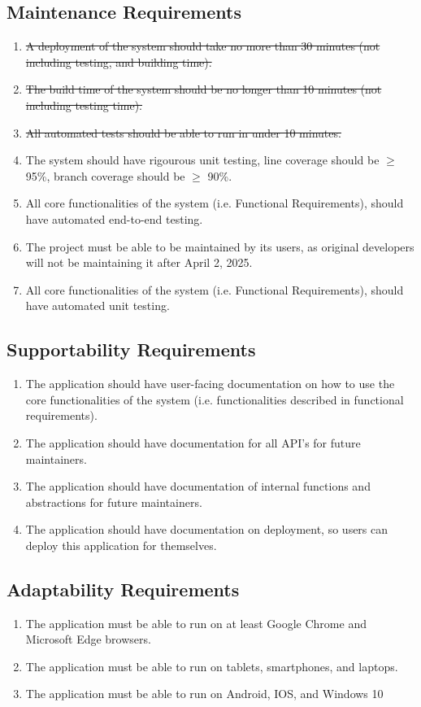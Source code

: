 \documentclass[12pt]{article}
\begin{document}
\subsection{Maintenance Requirements}
\begin{enumerate} [{MS-MTN}1.]
  \item \sout{A deployment of the system should take no more than 30
      minutes (not
    including testing, and building time).}
  \item \sout{The build time of the system should be no longer than
      10 minutes (not
    including testing time).}
  \item \sout{All automated tests should be able to run in under 10 minutes.}
  \item The system should have rigourous unit testing, line coverage should be
    $\ge$ 95\%, branch coverage should be $\ge$ 90\%.
  \item All core functionalities of the system (i.e. Functional Requirements),
    should have automated end-to-end testing.
  \item The project must be able to be maintained by its users, as original
    developers will not be maintaining it after April 2, 2025.
  \item All core functionalities of the system (i.e. Functional Requirements),
    should have automated unit testing.
\end{enumerate}
\subsection{Supportability Requirements}
\begin{enumerate} [{MS-SUP}1.]
  \item The application should have user-facing documentation on how to use the
    core functionalities of the system (i.e. functionalities described in
    functional requirements).
  \item The application should have documentation for all API's for future
    maintainers.
  \item The application should have documentation of internal functions and
    abstractions for future maintainers.
  \item The application should have documentation on deployment, so users can
    deploy this application for themselves.
\end{enumerate}
\subsection{Adaptability Requirements}
\begin{enumerate} [{MS-ADP}1.]
  \item The application must be able to run on at least Google Chrome and
    Microsoft Edge browsers.
  \item The application must be able to run on tablets, smartphones, and
    laptops.
  \item The application must be able to run on Android, IOS, and Windows 10
\end{enumerate}
\end{document}
